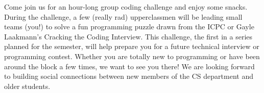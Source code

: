 Come join us for an hour-long group coding challenge and enjoy some snacks. During the challenge, a few (really rad) upperclassmen will be leading small teams (you!) to solve a fun programming puzzle drawn from the ICPC or Gayle Laakmann's Cracking the Coding Interview. This challenge, the first in a series planned for the semester, will help prepare you for a future technical interview or programming contest. Whether you are totally new to programming or have been around the block a few times, we want to see you there! We are looking forward to building social connections between new members of the CS department and older students.